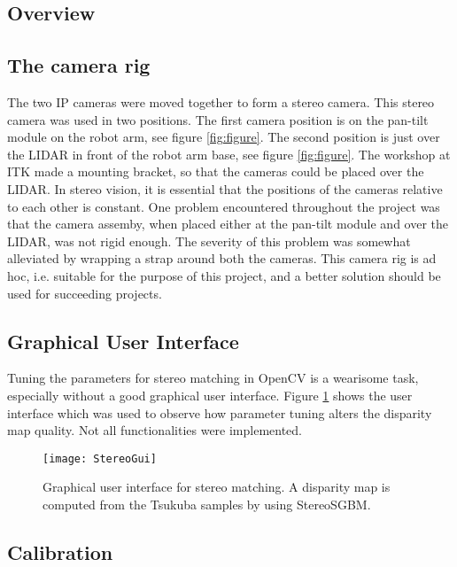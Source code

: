\subsection{Overview}

\subsection{The camera rig}

The two IP cameras were moved together to form a stereo camera. This stereo camera was used in two positions. The first camera position is on the pan-tilt module on the robot arm, see figure \ref{fig:figure}. The second position is just over the LIDAR in front of the robot arm base, see figure \ref{fig:figure}.  The workshop at ITK made a mounting bracket, so that the cameras could be placed over the LIDAR. In stereo vision, it is essential that the positions of the cameras relative to each other is constant. One problem encountered throughout the project was that the camera assemby, when placed either at the pan-tilt module and over the LIDAR, was not rigid enough. The severity of this problem was somewhat alleviated by wrapping a strap around both the cameras. This camera rig is ad hoc, i.e. suitable for the purpose of this project, and a better solution should be used for succeeding projects.

\subsection{Graphical User Interface}

Tuning the parameters for stereo matching in OpenCV is a wearisome task, especially without a good graphical user interface. Figure \ref{fig:StereoGui} shows the user interface which was used to observe how parameter tuning alters the disparity map quality. Not all functionalities were implemented.

\begin{figure}
	\texttt{[image: StereoGui]}
	\caption{Graphical user interface for stereo matching. A disparity map is computed from the Tsukuba samples by using StereoSGBM. }
	\label{fig:StereoGui}
\end{figure}

\subsection{Calibration}

